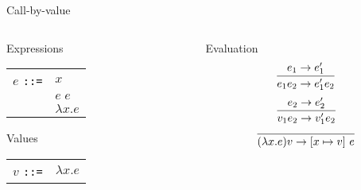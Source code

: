 %
\begin{frame}{Call-by-value}

\begin{columns}
\begin{column}{0.4\textwidth}

\begin{block}{Expressions}
\begin{tabular}{ll}
$e$ \texttt{::=} & $x$              \\
                 & $e \; e$         \\
                 & $\lambda x . e$  \\
\end{tabular}
\end{block}

\begin{block}{Values}
\begin{tabular}{ll}
$v$ \texttt{::=} & $\lambda x . e$  \\
\end{tabular}
\end{block}

\end{column}
\begin{column}{0.4\textwidth}

\begin{block}{Evaluation}
\[
\infer{e_1 e_2 \to e_1' e_2}{e_1 \to e_1'}
\]
\[
\infer{v_1 e_2 \to v_1' e_2}{e_2 \to e_2'}
\]
\[
\infer{(\lambda x . e) v \to \left[x \mapsto v \right] \, e}{}
\]
\end{block}

\end{column}
\end{columns}

\end{frame}

